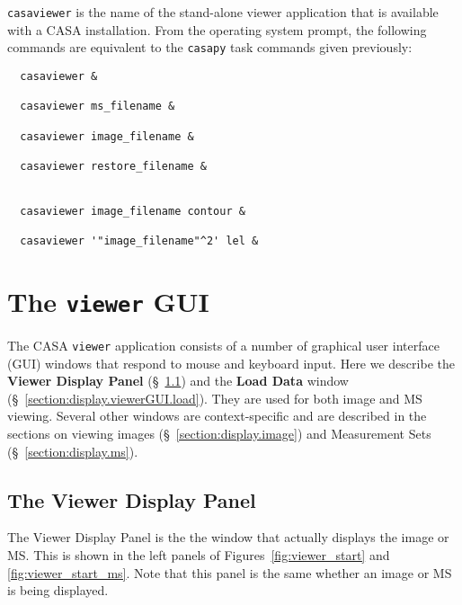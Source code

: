 {\tt casaviewer} is the name of the stand-alone viewer application that
is available with a CASA installation.  From the operating system prompt,
the following commands are equivalent to the {\tt casapy} task commands
given previously:

\small
\begin{verbatim}
  casaviewer &
  
  casaviewer ms_filename &
  
  casaviewer image_filename &
  
  casaviewer restore_filename &
  
  
  casaviewer image_filename contour &
  
  casaviewer '"image_filename"^2' lel &
\end{verbatim}
\normalsize

\section{The {\tt viewer} GUI}
\label{section:display.viewerGUI}

The CASA {\tt viewer} application consists of a number of
graphical user interface (GUI) windows that respond to mouse and
keyboard input.  Here we describe the {\bf Viewer Display Panel} 
(\S~\ref{section:display.viewerGUI.displaypanel}) and the
{\bf Load Data} window (\S~\ref{section:display.viewerGUI.load}).
They are used for both image and MS viewing.  Several other windows
are context-specific and are described in the sections on viewing
images (\S~\ref{section:display.image}) and Measurement Sets
(\S~\ref{section:display.ms}).


\subsection{The Viewer Display Panel}
\label{section:display.viewerGUI.displaypanel}

 
The Viewer Display Panel is the the window that actually displays the
image or MS.  This is shown in the left panels of 
Figures~\ref{fig:viewer_start} and \ref{fig:viewer_start_ms}.
Note that this panel is the same whether an image or MS is
being displayed.
 
